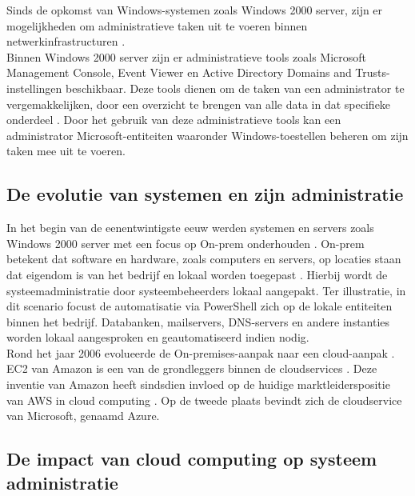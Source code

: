
Sinds de opkomst van Windows-systemen zoals Windows 2000 server, zijn er mogelijkheden om administratieve taken uit te voeren binnen netwerkinfrastructuren \autocite{Tulloch2001}. \\

Binnen Windows 2000 server zijn er administratieve tools zoals Microsoft Management Console, Event Viewer en Active Directory Domains and Trusts-instellingen beschikbaar. Deze tools dienen om de taken van een administrator te vergemakkelijken, door een overzicht te brengen van alle data in dat specifieke onderdeel \autocite{Sibisi2022}. Door het gebruik van deze administratieve tools kan een administrator Microsoft-entiteiten waaronder Windows-toestellen beheren om zijn taken mee uit te voeren. 

\subsection{De evolutie van systemen en zijn administratie}


In het begin van de eenentwintigste eeuw werden systemen en servers zoals Windows 2000 server met een focus op \ac{On-prem} onderhouden \autocite{Microsoft2022a}. \ac{On-prem} betekent dat software en hardware, zoals computers en servers, op locaties staan dat eigendom is van het bedrijf en lokaal worden toegepast \autocite{Gastermann2015}. Hierbij wordt de systeemadministratie door systeembeheerders lokaal aangepakt. Ter illustratie, in dit scenario focust de automatisatie via PowerShell zich op de lokale entiteiten binnen het bedrijf. Databanken, mailservers, \ac{DNS}-servers en andere instanties worden lokaal aangesproken en geautomatiseerd indien nodig. \\

Rond het jaar 2006 evolueerde de On-premises-aanpak naar een cloud-aanpak \autocite{Hayes2008}. \ac{EC2} van Amazon is een van de grondleggers binnen de cloudservices \autocite{Qian2009}. Deze inventie van Amazon heeft sindsdien invloed op de huidige marktleiderspositie van AWS in cloud computing \autocite{Vailshery2022}. Op de tweede plaats bevindt zich de cloudservice van Microsoft, genaamd Azure.



\subsection{De impact van cloud computing op systeem administratie}

